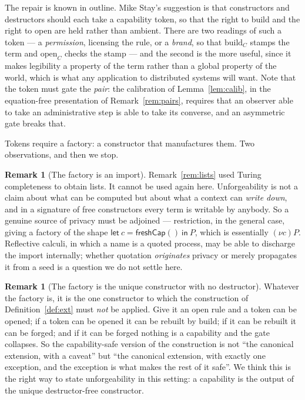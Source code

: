 \documentclass[11pt]{article}
\theoremstyle{plain}
\theoremstyle{definition}
\newtheorem{remark}[theorem]{Remark}
\newcommand{\op}{\mathrm{open}}
\newcommand{\bd}{\mathrm{build}}
\begin{document}
The repair is known in outline. Mike Stay's suggestion is that constructors and destructors should
each take a capability token, so that the right to build and the right to open are held rather than
ambient. There are two readings of such a token --- a \emph{permission}, licensing the rule, or a
\emph{brand}, so that $\bd_C$ stamps the term and $\op_C$ checks the stamp --- and the second is the
more useful, since it makes legibility a property of the term rather than a global property of the
world, which is what any application to distributed systems will want. Note that the token must gate
the \emph{pair}: the calibration of Lemma~\ref{lem:calib}, in the equation-free presentation of
Remark~\ref{rem:pairs}, requires that an observer able to take an administrative step is able to take
its converse, and an asymmetric gate breaks that.

Tokens require a factory: a constructor that manufactures them. Two observations, and then we stop.

\begin{remark}[The factory is an import]
Remark~\ref{rem:lists} used Turing completeness to obtain lists. It cannot be used again here.
Unforgeability is not a claim about what can be computed but about what a context can \emph{write
down}, and in a signature of free constructors every term is writable by anybody. So a genuine source
of privacy must be adjoined --- restriction, in the general case, giving a factory of the shape
$\mathsf{let}\ c = \mathsf{freshCap}()\ \mathsf{in}\ P$, which is essentially $(\nu c)P$. Reflective
calculi, in which a name is a quoted process, may be able to discharge the import internally; whether
quotation \emph{originates} privacy or merely propagates it from a seed is a question we do not settle
here.
\end{remark}

\begin{remark}[The factory is the unique constructor with no destructor]
\label{rem:nodestructor}
Whatever the factory is, it is the one constructor to which the construction of
Definition~\ref{def:ext} must \emph{not} be applied. Give it an $\op$ rule and a token can be opened;
if a token can be opened it can be rebuilt by $\bd$; if it can be rebuilt it can be forged; and if it
can be forged nothing is a capability and the gate collapses. So the capability-safe version of the
construction is not ``the canonical extension, with a caveat'' but ``the canonical extension, with
exactly one exception, and the exception is what makes the rest of it safe''. We think this is the
right way to state unforgeability in this setting: a capability is the output of the unique
destructor-free constructor.
\end{remark}
\end{document}
